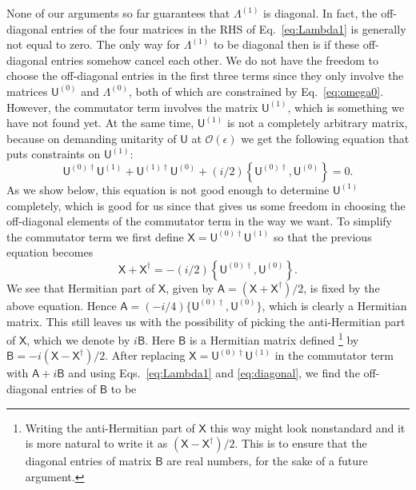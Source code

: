 None of our arguments so far guarantees that $\Lambda^{(1)}$ is diagonal.
In fact, the off-diagonal entries of the four matrices in the RHS of Eq.~\eqref{eq:Lambda1} is generally not equal to zero.
The only way for $\Lambda^{(1)}$ to be diagonal then is if these off-diagonal entries somehow cancel each other.
We do not have the freedom to choose the off-diagonal entries in the first three terms since they only involve the matrices $\mathsf{U}^{(0)}$ and $\Lambda^{(0)}$, both of which are constrained by Eq.~\eqref{eq:omega0}.
However, the commutator term involves the matrix $\mathsf{U}^{(1)}$, which is something we have not found yet.
At the same time, $\mathsf{U}^{(1)}$ is not a completely arbitrary matrix, because on demanding unitarity of $\mathsf{U}$ at $\mathcal{O}(\epsilon)$ we get the following equation that puts constraints on $\mathsf{U}^{(1)}$:
%
\begin{equation}
  \mathsf{U}^{(0)\dagger}\mathsf{U}^{(1)} + \mathsf{U}^{(1)\dagger}\mathsf{U}^{(0)} + (i/2)\left\{\mathsf{U}^{(0)\dagger}, \mathsf{U}^{(0)}\right\}= 0.
  \label{eq:unitarity}
\end{equation}
%
As we show below, this equation is not good enough to determine $\mathsf{U}^{(1)}$ completely, which is good for us since that gives us some freedom in choosing the off-diagonal elements of the commutator term in the way we want.
To simplify the commutator term we first define $\mathsf{X} = \mathsf{U}^{(0)\dagger}\mathsf{U}^{(1)}$ so that the previous equation becomes
%
\begin{equation}
  \mathsf{X} + \mathsf{X}^{\dagger} = -(i/2)\left\{\mathsf{U}^{(0)\dagger}, \mathsf{U}^{(0)}\right\}.
\end{equation}
%
We see that Hermitian part of $\mathsf{X}$, given by $\mathsf{A} = (\mathsf{X} + \mathsf{X}^{\dagger})/2$, is fixed by the above equation.
Hence $\mathsf{A} = (-i/4)\{\mathsf{U}^{(0)\dagger},\mathsf{U}^{(0)}\}$, which is clearly a Hermitian matrix.
This still leaves us with the possibility of picking the anti-Hermitian part of $\mathsf{X}$, which we denote by $i\mathsf{B}$. Here $\mathsf{B}$ is a Hermitian matrix defined%
\footnote{%
  Writing the anti-Hermitian part of $\mathsf{X}$ this way might look nonstandard and it is more natural to write it as $(\mathsf{X} - \mathsf{X}^{\dagger})/2$.
  This is to ensure that the diagonal entries of matrix $\mathsf{B}$ are real numbers, for the sake of a future argument.
}
by $\mathsf{B} = -i(\mathsf{X} - \mathsf{X}^{\dagger})/2$.
After replacing $\mathsf{X} = \mathsf{U}^{(0)\dagger}\mathsf{U}^{(1)}$ in the commutator term with $\mathsf{A} + i\mathsf{B}$ and using Eqs.~\eqref{eq:Lambda1} and \eqref{eq:diagonal}, we find the off-diagonal entries of $\mathsf{B}$ to be
